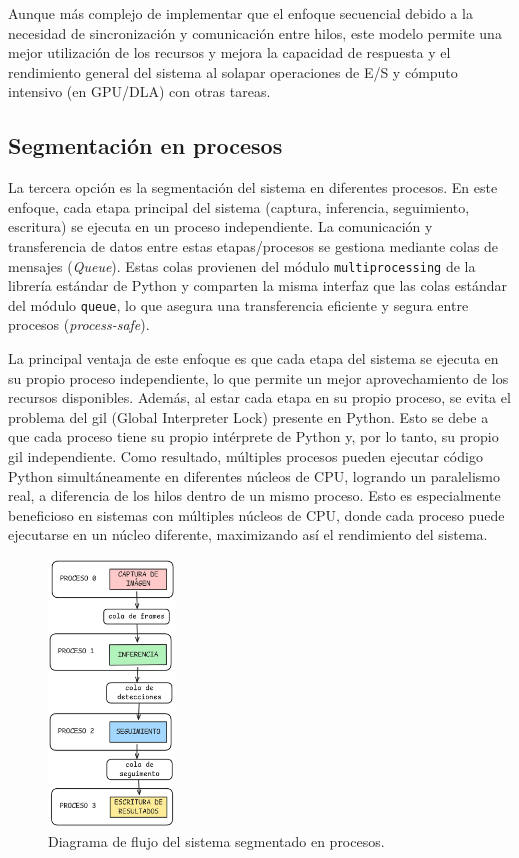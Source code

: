 \documentclass[11pt,spanish,listoffigures,listoftables]{tfgetsinf}
\begin{document}
Aunque más complejo de implementar que el enfoque secuencial debido a la necesidad de sincronización y comunicación entre hilos, este modelo permite una mejor utilización de los recursos y mejora la capacidad de respuesta y el rendimiento general del sistema al solapar operaciones de E/S y cómputo intensivo (en GPU/DLA) con otras tareas.

\subsection{Segmentación en procesos} \label{sub:segmentacion_procesos}

La tercera opción es la segmentación del sistema en diferentes procesos. En este enfoque, cada etapa principal del sistema (captura, inferencia, seguimiento, escritura) se ejecuta en un proceso independiente. La comunicación y transferencia de datos entre estas etapas/procesos se gestiona mediante colas de mensajes (\textit{Queue}). Estas colas provienen del módulo \texttt{multiprocessing}\cite{multiprocessing} de la librería estándar de Python y comparten la misma interfaz que las colas estándar del módulo \texttt{queue}, lo que asegura una transferencia eficiente y segura entre procesos (\textit{process-safe}).

La principal ventaja de este enfoque es que cada etapa del sistema se ejecuta en su propio proceso independiente, lo que permite un mejor aprovechamiento de los recursos disponibles. Además, al estar cada etapa en su propio proceso, se evita el problema del \gls{gil} (Global Interpreter Lock) presente en Python. Esto se debe a que cada proceso tiene su propio intérprete de Python y, por lo tanto, su propio \gls{gil} independiente. Como resultado, múltiples procesos pueden ejecutar código Python simultáneamente en diferentes núcleos de CPU, logrando un paralelismo real, a diferencia de los hilos dentro de un mismo proceso. Esto es especialmente beneficioso en sistemas con múltiples núcleos de CPU, donde cada proceso puede ejecutarse en un núcleo diferente, maximizando así el rendimiento del sistema.

\begin{figure}[H]
   \centering
   \includegraphics[width=0.3\textwidth]{images/diseno_e_implementacion/segmentacion_procesos.png}
   \caption[Diagrama de flujo del sistema segmentado en procesos]{Diagrama de flujo del sistema segmentado en procesos.}
   \label{fig:procesos}
\end{figure}
\end{document}
